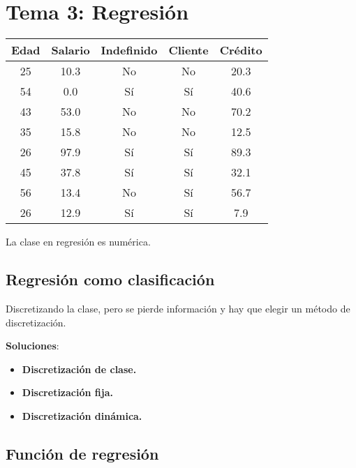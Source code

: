 \documentclass[12pt, twoside, openright]{report} %
\begin{document}
\chapter{Tema 3: Regresión}
\begin{table}[h]
	\begin{tabular}{c|c|c|c|c}
		\textbf{Edad} & \textbf{Salario} & \textbf{Indefinido} & \textbf{Cliente} & \textbf{Crédito} \\ \hline
		25            & 10.3             & No                  & No               & 20.3             \\
		54            & 0.0              & Sí                  & Sí               & 40.6             \\
		43            & 53.0             & No                  & No               & 70.2             \\
		35            & 15.8             & No                  & No               & 12.5             \\
		26            & 97.9             & Sí                  & Sí               & 89.3             \\
		45            & 37.8             & Sí                  & Sí               & 32.1             \\
		56            & 13.4             & No                  & Sí               & 56.7             \\
		26            & 12.9             & Sí                  & Sí               & 7.9              \\ \hline
	\end{tabular}
\end{table}
La clase en regresión es numérica.

\section{Regresión como clasificación}

Discretizando la clase, pero se pierde información y hay que elegir un método de discretización.

\textbf{Soluciones}:

\begin{itemize}
	\item \textbf{Discretización de clase.}
	\item \textbf{Discretización fija.}
	\item \textbf{Discretización dinámica.}
\end{itemize}

\section{Función de regresión}
\end{document}
